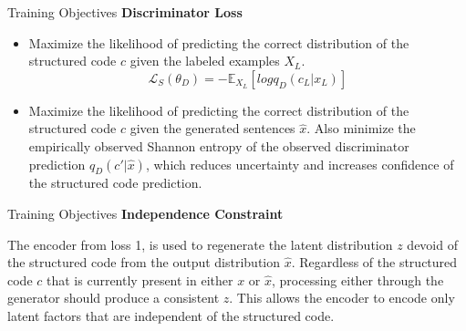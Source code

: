 \documentclass{beamer}
\begin{document}
  \begin{frame}{Training Objectives}
    \textbf{Discriminator Loss} 
    \begin{itemize}
      \item Maximize the likelihood of predicting the correct distribution of the structured code $c$ given the labeled examples $X_L$.
      \begin{equation*}
        \mathcal{L}_S(\theta_D) = - \mathbb{E}_{X_L}[log q_D(c_L|x_L)]
      \end{equation*}
      \item Maximize the likelihood of predicting the correct distribution of the structured code $c$ given the generated sentences $\hat{x}$. Also minimize the empirically observed Shannon entropy of the observed discriminator prediction $q_D(c\prime|\hat{x})$, which reduces uncertainty and increases confidence of the structured code prediction.
    \end{itemize}
  \end{frame}

  \begin{frame}{Training Objectives}
    \textbf{Independence Constraint}
    
    The encoder from loss 1, is used to regenerate the latent distribution $z$ devoid of the structured code from the output distribution $\hat{x}$. Regardless of the structured code  $c$ that is currently present in either $x$ or $\hat{x}$, processing either through the generator should produce a consistent $z$. This allows the encoder to encode only latent factors that are independent of the structured code.
  \end{frame}
\end{document}
